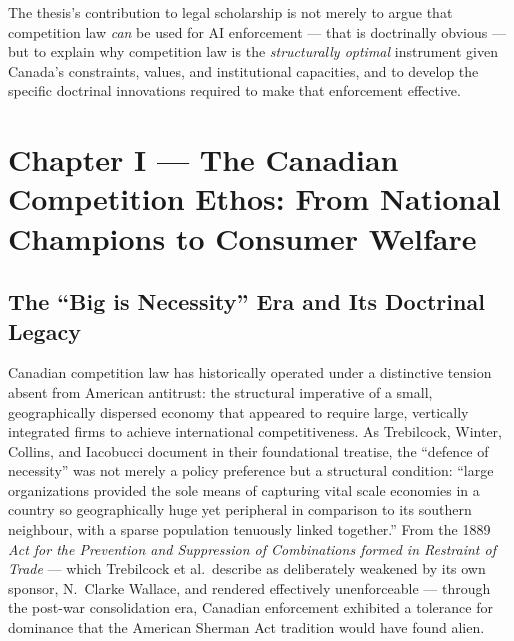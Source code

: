 The thesis's contribution to legal scholarship is not merely to argue that competition law \textit{can} be used for AI enforcement --- that is doctrinally obvious --- but to explain why competition law is the \textit{structurally optimal} instrument given Canada's constraints, values, and institutional capacities, and to develop the specific doctrinal innovations required to make that enforcement effective.


\section{Chapter I --- The Canadian Competition Ethos: From National Champions to Consumer Welfare}
\label{ch:ethos}

\subsection{The ``Big is Necessity'' Era and Its Doctrinal Legacy}

Canadian competition law has historically operated under a distinctive tension absent from American antitrust: the structural imperative of a small, geographically dispersed economy that appeared to require large, vertically integrated firms to achieve international competitiveness. As Trebilcock, Winter, Collins, and Iacobucci document in their foundational treatise, the ``defence of necessity'' was not merely a policy preference but a structural condition: ``large organizations provided the sole means of capturing vital scale economies in a country so geographically huge yet peripheral in comparison to its southern neighbour, with a sparse population tenuously linked together.'' From the 1889 \textit{Act for the Prevention and Suppression of Combinations formed in Restraint of Trade} --- which Trebilcock et al.\ describe as deliberately weakened by its own sponsor, N.\ Clarke Wallace, and rendered effectively unenforceable --- through the post-war consolidation era, Canadian enforcement exhibited a tolerance for dominance that the American Sherman Act tradition would have found alien.

